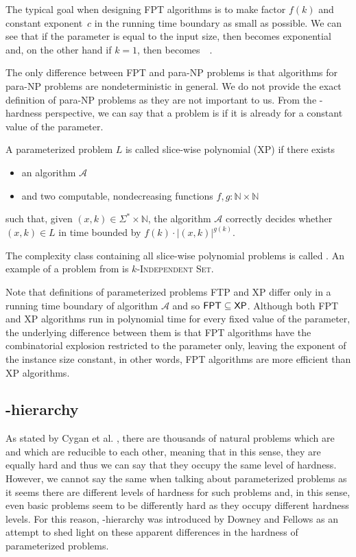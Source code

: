 The typical goal when designing FPT algorithms is to make factor $f(k)$ and constant exponent~$c$
in the running time boundary as small as possible.
We can see that if the parameter is equal to the input size, then \FPT becomes exponential and,
on the other hand if $k = 1$, then \FPT becomes~\Po~\cite{Koutensky2020}.

The only difference between FPT and para-NP problems is that algorithms for para-NP problems are
nondeterministic in general.
We do not provide the exact definition of para-NP problems as they are not important to us.
From the \pNP-hardness perspective, we can say that a problem is \pNPh if it is \NPh already for a constant value of the parameter.

\begin{definition}[XP]
    A parameterized problem $L$ is called slice-wise polynomial (XP) if there exists
    \begin{itemize}
        \item an algorithm $\mathcal{A}$
        \item and two computable, nondecreasing functions $f,g : \mathbb{N} \times \mathbb{N}$
    \end{itemize}
    such that, given $(x,k) \in \Sigma^* \times \mathbb{N}$,
    the algorithm $\mathcal{A}$ correctly decides whether $(x, k) \in L$ in time bounded by
    $f(k) \cdot |(x,k)|^{g(k)}$.
\end{definition}

The complexity class containing all slice-wise polynomial problems is called \XP.
An example of a problem from \XP is $k$-\textsc{Independent Set}.

Note that definitions of parameterized problems FTP and XP differ only in a running time boundary of algorithm $\mathcal{A}$
and so $\textsf{FPT} \subseteq \textsf{XP}$.
Although both FPT and XP algorithms run in polynomial time for every fixed value of the parameter,
the underlying difference between them is that FPT algorithms have the combinatorial explosion
restricted to the parameter only, leaving the exponent of the instance size constant, in other words,
FPT algorithms are more efficient than XP algorithms.


\subsection{\W-hierarchy}

As stated by Cygan et al. \cite[p.~423]{Cygan2015},
there are thousands of natural problems which are \NPc and which are reducible to each other,
meaning that in this sense, they are equally hard and thus we can say that
they occupy the same level of hardness.
However, we cannot say the same when talking about parameterized problems as it seems there are
different levels of hardness for such problems and, in this sense, even basic problems
seem to be differently hard as they occupy different hardness levels.
For this reason, \W-hierarchy was introduced by Downey and Fellows \cite{Downey1999} as
an attempt to shed light on these apparent differences in the hardness of parameterized problems. 

